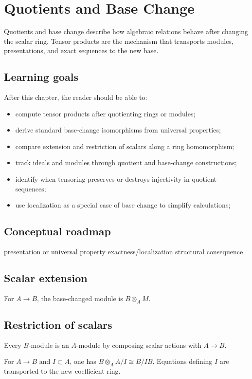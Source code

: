 \chapter{Quotients and Base Change}
\label{ch:v11}

Quotients and base change describe how algebraic relations behave after changing the scalar ring. Tensor products are the mechanism that transports modules, presentations, and exact sequences to the new base.

\section*{Learning goals}
After this chapter, the reader should be able to:
\begin{itemize}
\item compute tensor products after quotienting rings or modules;
\item derive standard base-change isomorphisms from universal properties;
\item compare extension and restriction of scalars along a ring homomorphism;
\item track ideals and modules through quotient and base-change constructions;
\item identify when tensoring preserves or destroys injectivity in quotient sequences;
\item use localization as a special case of base change to simplify calculations;
\end{itemize}
\section*{Conceptual roadmap}
\volroadmap
  {presentation or universal property}
  {exactness/localization}
  {structural consequence}

\section{Scalar extension}
For $A\to B$, the base-changed module is $B\otimes_A M$.

\section{Restriction of scalars}
Every $B$-module is an $A$-module by composing scalar actions with $A\to B$.

\begin{example}\label{ex:v11-expand-01}
For $A\to B$ and $I\subset A$, one has $B\otimes_AA/I\cong B/IB$. Equations defining $I$ are transported to the new coefficient ring.
\end{example}
